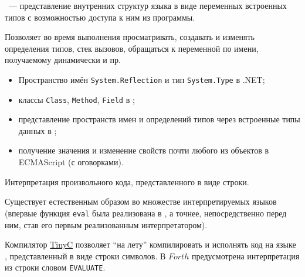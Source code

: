
\ --- представление внутренних структур
языка в виде переменных встроенных типов с возможностью доступа к ним из
программы.

Позволяет во время выполнения просматривать, создавать и изменять определения
типов, стек вызовов, обращаться к переменной по имени, получаемому динамически и
пр.

\begin{itemize}[nosep]
  \item 
Пространство имён \verb|System.Reflection| и тип \verb|System.Type| в .NET;
  \item 
классы \verb|Class|, \verb|Method|, \verb|Field| в \java;
  \item 
представление пространств имен и определений типов через встроенные типы данных
в \py;
  \item 
получение значения и изменение свойств почти любого из объектов в ECMAScript (с
оговорками).
\end{itemize}


Интерпретация произвольного кода, представленного в виде строки.

Существует естественным образом во множестве интерпретируемых языков (впервые
функция \verb|eval| была реализована в \lisp, а точнее, непосредственно перед
ним, став его первым реализованным интерпретатором).

Компилятор \href{https://ru.wikipedia.org/wiki/Tiny_C_Compiler}{TinyC} позволяет
``на лету'' компилировать и исполнять код на языке \ci, представленный в виде
строки символов. В
\href{https://ru.wikipedia.org/wiki/%D0%A4%D0%BE%D1%80%D1%82_(%D1%8F%D0%B7%D1%8B%D0%BA_%D0%BF%D1%80%D0%BE%D0%B3%D1%80%D0%B0%D0%BC%D0%BC%D0%B8%D1%80%D0%BE%D0%B2%D0%B0%D0%BD%D0%B8%D1%8F)}{$Forth$}
предусмотрена интерпретация из строки словом \verb|EVALUATE|.

\secup

\secup
\secup